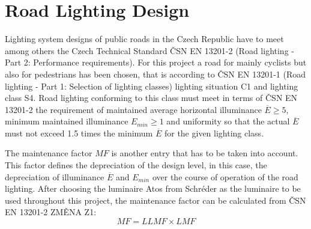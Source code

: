 \section{Road Lighting Design}
Lighting system designs of public roads in the Czech Republic have to meet among others the Czech Technical Standard \v{C}SN EN 13201-2 (Road lighting - Part 2: Performance requirements). For this project a road for mainly cyclists but also for pedestrians has been chosen, that is according to \v{C}SN EN 13201-1 (Road lighting - Part 1: Selection of lighting classes) lighting situation C1 and lighting class S4. Road lighting conforming to this class must meet in terms of \v{C}SN EN 13201-2 the requirement of maintained average horizontal illuminance $\overline{E}\geq 5$, minimum maintained illuminance $E_{min}\geq 1$ and uniformity so that the actual $\overline{E}$ must not exceed 1.5 times the minimum $\overline{E}$ for the given lighting class.

The maintenance factor $MF$ is another entry that has to be taken into account. This factor defines the depreciation of the design level, in this case, the depreciation of illuminance $\overline{E}$ and $E_{min}$ over the course of operation of the road lighting. After choosing the luminaire Atos from Schr\'{e}der as the luminaire to be used throughout this project, the maintenance factor can be calculated from \v{C}SN EN 13201-2 ZM\v{E}NA Z1:
\begin{equation}
MF=LLMF \times LMF
\end{equation}